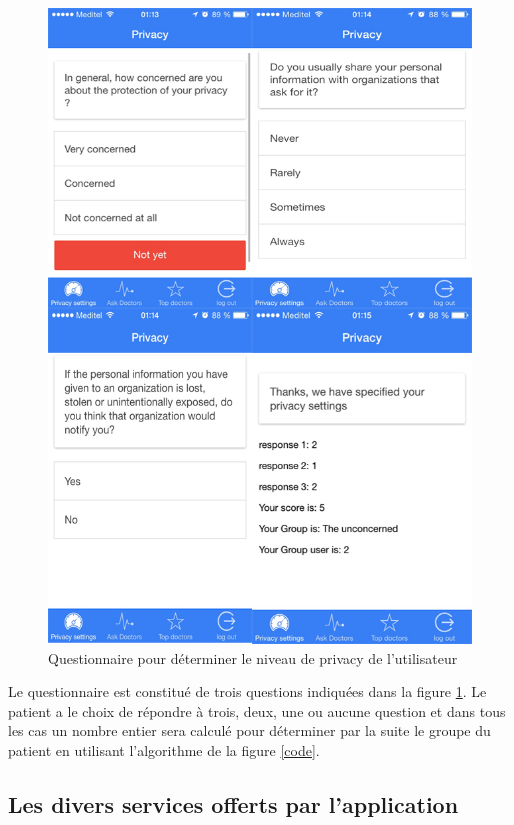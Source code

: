 \newpage

\begin{figure}[!ht]
\begin{center}
\includegraphics[scale=0.6]{privacy.jpg}
\caption{Questionnaire pour déterminer le niveau de privacy de l’utilisateur}
\label{privacy}
\end{center}
\end{figure}

Le questionnaire est constitué de trois questions indiquées dans la figure \ref{privacy}. Le patient a le choix de répondre à trois, deux, une ou aucune question et dans tous les cas un nombre entier sera calculé pour déterminer par la suite le groupe du patient en utilisant l'algorithme de la figure \ref{code}.

\subsection{Les divers services offerts par l’application}

